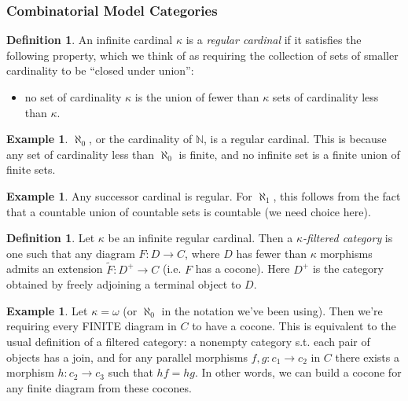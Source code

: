 \documentclass[letterpaper]{article}
\theoremstyle{definition}
\newtheorem{example}[lemma]{Example}
\newtheorem{definition}[lemma]{Definition}
\newcommand{\mbb}{\mathbb}
\begin{document}
\subsubsection{Combinatorial Model Categories}
\begin{definition}
An infinite cardinal $\kappa$ is a \emph{regular cardinal} if it
satisfies the following property, which we think of as requiring the
collection of sets of smaller cardinality to be ``closed
under union'':
\begin{itemize}
\item no set of cardinality $\kappa$ is the union of fewer than
  $\kappa$ sets of cardinality less than $\kappa$.
\end{itemize}
\end{definition}

\begin{example}
$\aleph_0$, or the cardinality of $\mbb N$, is a regular
cardinal. This is because any set of cardinality less than $\aleph_0$
is finite, and no infinite set is a finite union of finite sets.
\end{example}

\begin{example}
Any successor cardinal is regular. For $\aleph_1$, this follows from
the fact that a countable union of countable sets is countable (we
need choice here).
\end{example}



\begin{definition}
Let $\kappa$ be an infinite regular cardinal. Then a
\emph{$\kappa$-filtered category} is one such that any diagram $F :D
\rightarrow C$, where $D$ has fewer than $\kappa$ morphisms admits an
extension $\widetilde F: D^+ \rightarrow C$ (i.e. $F$ has a
cocone). Here $D^+$ is the category obtained by freely adjoining a
terminal object to $D$.
\end{definition}

\begin{example}
Let $\kappa = \omega$ (or $\aleph_0$ in the notation we've been
using). Then we're requiring every FINITE diagram in $C$ to have a
cocone. This is equivalent to the usual definition of a filtered
category: a nonempty category s.t. each pair of objects has a join,
and for any parallel morphisms $f,g: c_1 \rightarrow c_2$ in $C$ there
exists a morphism $h : c_2 \rightarrow c_3$ such that $hf = hg$. In
other words, we can build a cocone for any finite diagram from these cocones.
\end{example}
\end{document}
